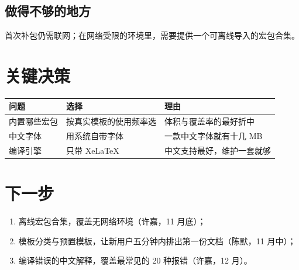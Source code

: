 \documentclass[UTF8,zihao=-4]{ctexart}
\begin{document}
\subsection{做得不够的地方}
\begin{risk}[待改进]
  首次补包仍需联网；在网络受限的环境里，需要提供一个可离线导入的宏包合集。
\end{risk}

\section{关键决策}

\begin{center}
\small
\renewcommand{\arraystretch}{1.35}
\begin{tabularx}{\linewidth}{@{}l X X@{}}
  \toprule
  \textbf{问题} & \textbf{选择} & \textbf{理由} \\
  \midrule
  内置哪些宏包 & 按真实模板的使用频率选 & 体积与覆盖率的最好折中 \\
  中文字体     & 用系统自带字体           & 一款中文字体就有十几 MB \\
  编译引擎     & 只带 Xe\LaTeX{}          & 中文支持最好，维护一套就够 \\
  \bottomrule
\end{tabularx}
\end{center}

\section{下一步}
\begin{enumerate}
  \item 离线宏包合集，覆盖无网络环境（许嘉，11 月底）；
  \item 模板分类与预置模板，让新用户五分钟内排出第一份文档（陈默，11 月中）；
  \item 编译错误的中文解释，覆盖最常见的 20 种报错（许嘉，12 月）。
\end{enumerate}

\vspace{.5em}
\hfill\subomark[1.4em]
\end{document}
